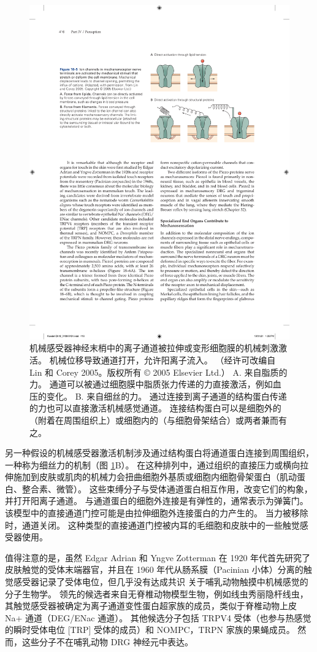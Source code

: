 \begin{figure}[htbp]
	\centering
	\includegraphics[width=0.5\linewidth]{chap18/fig_18_5}
	\caption{机械感受器神经末梢中的离子通道被拉伸或变形细胞膜的机械刺激激活。 
		机械位移导致通道打开，允许阳离子流入。 （经许可改编自 Lin 和 Corey 2005。版权所有 © 2005 Elsevier Ltd.） 
		A. 来自脂质的力。 
		通道可以被通过细胞膜中脂质张力传递的力直接激活，例如血压的变化。 
		B. 来自细丝的力。 
		通过连接到离子通道的结构蛋白传递的力也可以直接激活机械感觉通道。 
		连接结构蛋白可以是细胞外的（附着在周围组织上）或细胞内的（与细胞骨架结合）或两者兼而有之。}
	\label{fig:18_5}
\end{figure}

另一种假设的机械感受器激活机制涉及通过结构蛋白将通道蛋白连接到周围组织，一种称为细丝力的机制（图 \ref{fig:18_5}B）。 
在这种排列中，通过组织的直接压力或横向拉伸施加到皮肤或肌肉的机械力会扭曲细胞外基质或细胞内细胞骨架蛋白（肌动蛋白、整合素、微管）。 
这些束缚分子与受体通道蛋白相互作用，改变它们的构象，并打开阳离子通道。 
与通道蛋白的细胞外连接是有弹性的，通常表示为弹簧门。 
该模型中的直接通道门控可能是由拉伸细胞外连接蛋白的力产生的。 当力被移除时，通道关闭。 
这种类型的直接通道门控被内耳的毛细胞和皮肤中的一些触觉感受器使用。


值得注意的是，虽然 Edgar Adrian 和 Yngve Zotterman 在 1920 年代首先研究了皮肤触觉的受体末端器官，并且在 1960 年代从肠系膜（Pacinian 小体）分离的触觉感受器记录了受体电位，但几乎没有达成共识 关于哺乳动物触摸中机械感觉的分子生物学。 
领先的候选者来自无脊椎动物模型生物，例如线虫秀丽隐杆线虫，其触觉感受器被确定为离子通道变性蛋白超家族的成员，类似于脊椎动物上皮 Na+ 通道（DEG/ENac 通道）。 
其他候选分子包括 TRPV4 受体（也参与热感觉的瞬时受体电位 [TRP] 受体的成员）和 NOMPC，TRPN 家族的果蝇成员。 
然而，这些分子不在哺乳动物 DRG 神经元中表达。


